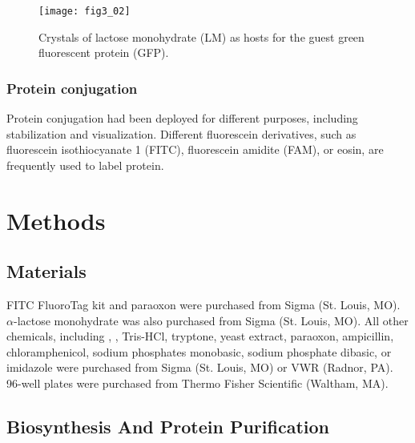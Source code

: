 \begin{refsection}
\begin{figure}[h!] \centering \texttt{[image: fig3\_02]} 
    \caption[Crystals of lactose monohydrate (LM) as hosts for the guest green
    fluorescent protein (GFP)]{Crystals of lactose monohydrate (LM) as hosts
        for the guest green fluorescent protein (GFP)\cite{Wang2001a}.}
    \label{fig:lm-intro}
\end{figure}

\subsubsection{Protein conjugation}

Protein conjugation had been deployed for different purposes, including
stabilization and visualization. Different fluorescein derivatives, such as
fluorescein isothiocyanate 1 (FITC), fluorescein amidite (FAM), or eosin, are
frequently used to label protein. 

\section{Methods}

\subsection{Materials}

FITC FluoroTag kit and paraoxon were purchased from Sigma (St. Louis, MO).
$\alpha$-lactose monohydrate was also purchased from Sigma (St. Louis, MO). All
other chemicals, including , , Tris-HCl, tryptone, yeast
extract, paraoxon, ampicillin, chloramphenicol, sodium phosphates monobasic,
sodium phosphate dibasic, or imidazole were purchased from Sigma (St. Louis,
MO) or VWR (Radnor, PA). 96-well plates were purchased from Thermo Fisher
Scientific (Waltham, MA).

\subsection{Biosynthesis And Protein Purification}
\label{sec:pte-chap3}


\end{refsection}
